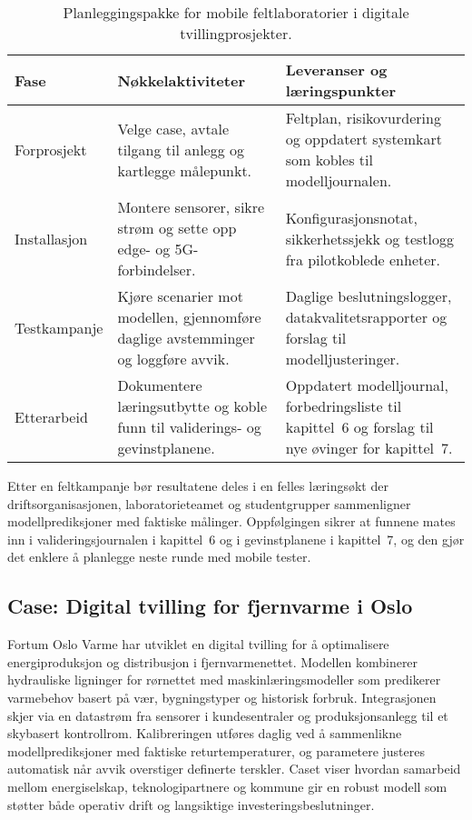 \begin{table}[ht]
    \centering
    \caption{Planleggingspakke for mobile feltlaboratorier i digitale tvillingprosjekter.}
    \label{tab:kap02-mobilelab}
    \begin{tabular}{p{}p{}p{}}
        \toprule
        \textbf{Fase} & \textbf{Nøkkelaktiviteter} & \textbf{Leveranser og læringspunkter} \\
        \midrule
        Forprosjekt & Velge case, avtale tilgang til anlegg og kartlegge målepunkt. & Feltplan, risikovurdering og oppdatert systemkart som kobles til modelljournalen. \\
        Installasjon & Montere sensorer, sikre strøm og sette opp edge- og 5G-forbindelser. & Konfigurasjonsnotat, sikkerhetssjekk og testlogg fra pilotkoblede enheter. \\
        Testkampanje & Kjøre scenarier mot modellen, gjennomføre daglige avstemminger og loggføre avvik. & Daglige beslutningslogger, datakvalitetsrapporter og forslag til modelljusteringer. \\
        Etterarbeid & Dokumentere læringsutbytte og koble funn til validerings- og gevinstplanene. & Oppdatert modelljournal, forbedringsliste til kapittel~6 og forslag til nye øvinger for kapittel~7. \\
        \bottomrule
    \end{tabular}
\end{table}

Etter en feltkampanje bør resultatene deles i en felles læringsøkt der driftsorganisasjonen, laboratorieteamet og studentgrupper sammenligner modellprediksjoner med faktiske målinger. Oppfølgingen sikrer at funnene mates inn i valideringsjournalen i kapittel~6 og i gevinstplanene i kapittel~7, og den gjør det enklere å planlegge neste runde med mobile tester.

\subsection{Case: Digital tvilling for fjernvarme i Oslo}
Fortum Oslo Varme har utviklet en digital tvilling for å optimalisere energiproduksjon og distribusjon i fjernvarmenettet.
Modellen kombinerer hydrauliske ligninger for rørnettet med maskinlæringsmodeller som predikerer varmebehov basert på vær,
bygningstyper og historisk forbruk. Integrasjonen skjer via en datastrøm fra sensorer i kundesentraler og produksjonsanlegg til
et skybasert kontrollrom. Kalibreringen utføres daglig ved å sammenlikne modellprediksjoner med faktiske returtemperaturer, og
parametere justeres automatisk når avvik overstiger definerte terskler. Caset viser hvordan samarbeid mellom energiselskap,
teknologipartnere og kommune gir en robust modell som støtter både operativ drift og langsiktige investeringsbeslutninger.


